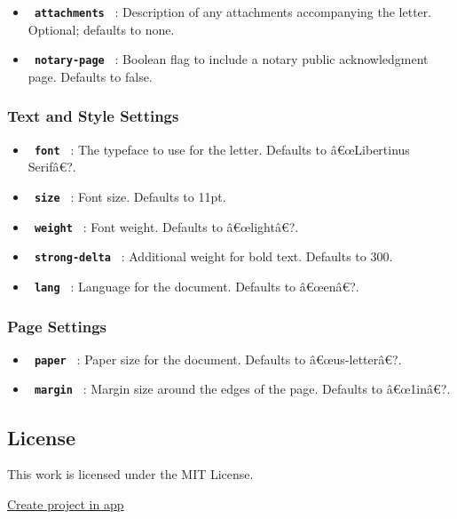 \begin{itemize}
\tightlist
\item
  \textbf{\texttt{\ attachments\ }} : Description of any attachments
  accompanying the letter. Optional; defaults to none.
\item
  \textbf{\texttt{\ notary-page\ }} : Boolean flag to include a notary
  public acknowledgment page. Defaults to false.
\end{itemize}

\subsubsection{Text and Style Settings}\label{text-and-style-settings}

\begin{itemize}
\tightlist
\item
  \textbf{\texttt{\ font\ }} : The typeface to use for the letter.
  Defaults to â€œLibertinus Serifâ€?.
\item
  \textbf{\texttt{\ size\ }} : Font size. Defaults to 11pt.
\item
  \textbf{\texttt{\ weight\ }} : Font weight. Defaults to â€œlightâ€?.
\item
  \textbf{\texttt{\ strong-delta\ }} : Additional weight for bold text.
  Defaults to 300.
\item
  \textbf{\texttt{\ lang\ }} : Language for the document. Defaults to
  â€œenâ€?.
\end{itemize}

\subsubsection{Page Settings}\label{page-settings}

\begin{itemize}
\tightlist
\item
  \textbf{\texttt{\ paper\ }} : Paper size for the document. Defaults to
  â€œus-letterâ€?.
\item
  \textbf{\texttt{\ margin\ }} : Margin size around the edges of the
  page. Defaults to â€œ1inâ€?.
\end{itemize}

\subsection{License}\label{license}

This work is licensed under the MIT License.

\href{/app?template=pro-letter&version=0.1.1}{Create project in app}

